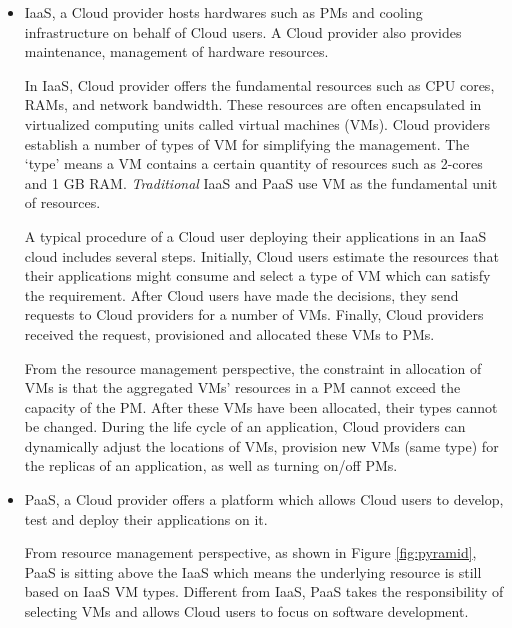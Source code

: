 \begin{itemize}
	\item IaaS, a Cloud provider hosts hardwares such as PMs and cooling infrastructure on behalf of Cloud users. A Cloud provider also provides maintenance, management of hardware resources. 

	In IaaS, Cloud provider offers the fundamental resources such as CPU cores, RAMs, and network bandwidth. These resources are often encapsulated in virtualized computing units called virtual machines (VMs). Cloud providers establish a number of types of VM for simplifying the management. The `type' means a VM contains a certain quantity of resources such as 2-cores and 1 GB RAM.  \emph{Traditional} IaaS and PaaS use VM as the fundamental unit of resources.

	A typical procedure of a Cloud user deploying their applications in an IaaS cloud includes several steps.
	Initially, Cloud users estimate the resources that their applications might consume and select a type of VM which can satisfy the requirement. After Cloud users have made the decisions, they send requests to Cloud providers for a number of VMs. Finally, Cloud providers received the request, provisioned and allocated these VMs to PMs. 

	From the resource management perspective, the constraint in allocation of VMs is that the aggregated VMs' resources in a PM cannot exceed the capacity of the PM. After these VMs have been allocated, their types cannot be changed. During the life cycle of an application, Cloud providers can dynamically adjust the locations of VMs, provision new VMs (same type) for the replicas of an application, as well as turning on/off PMs.



 	\item PaaS, a Cloud provider offers a platform which allows Cloud users to develop, test and deploy their applications on it.

 	From resource management perspective, as shown in Figure \ref{fig:pyramid}, PaaS is sitting above the IaaS which means the underlying resource is still based on IaaS VM types. Different from IaaS, PaaS takes the responsibility of selecting VMs and allows Cloud users to focus on software development. 


\end{itemize}
